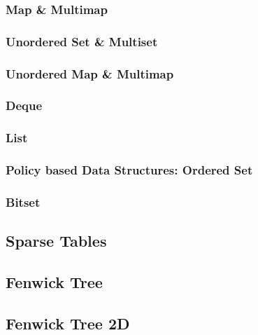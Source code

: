 \documentclass[10pt,landscape,twocolumn,a4paper,notitlepage]{article}
\begin{document}
    \subsubsection{Map \& Multimap}
    
    \subsubsection{Unordered Set \& Multiset}
    
    \subsubsection{Unordered Map \& Multimap}
    
    \subsubsection{Deque}
    
    \subsubsection{List}
    
    \subsubsection{Policy based Data Structures: Ordered Set}
    
    \subsubsection{Bitset}
    

  
  \subsection{Sparse Tables}
  

  \subsection{Fenwick Tree}
  

  \subsection{Fenwick Tree 2D}
  
\end{document}
